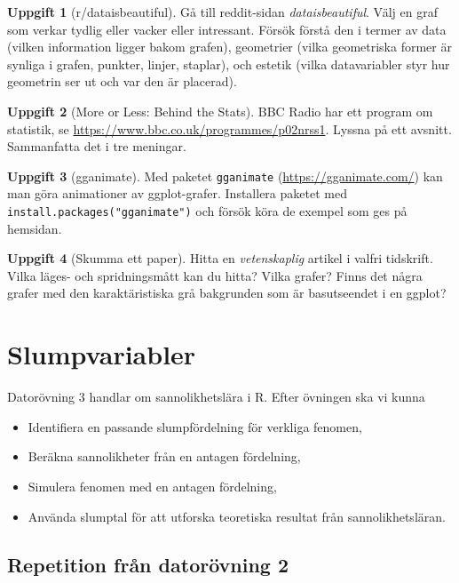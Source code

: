 \documentclass[
]{book}
\theoremstyle{definition}
\theoremstyle{definition}
\theoremstyle{definition}
\newtheorem{exercise}{Uppgift}[chapter]
\theoremstyle{definition}
\theoremstyle{remark}
\begin{document}
\begin{exercise}[r/dataisbeautiful]
Gå till reddit-sidan \emph{dataisbeautiful}. Välj en graf som verkar tydlig eller vacker eller intressant. Försök förstå den i termer av data (vilken information ligger bakom grafen), geometrier (vilka geometriska former är synliga i grafen, punkter, linjer, staplar), och estetik (vilka datavariabler styr hur geometrin ser ut och var den är placerad).
\end{exercise}

\begin{exercise}[More or Less: Behind the Stats]
BBC Radio har ett program om statistik, se \url{https://www.bbc.co.uk/programmes/p02nrss1}. Lyssna på ett avsnitt. Sammanfatta det i tre meningar.
\end{exercise}

\begin{exercise}[gganimate]
Med paketet \texttt{gganimate} (\url{https://gganimate.com/}) kan man göra animationer av ggplot-grafer. Installera paketet med \texttt{install.packages("gganimate")} och försök köra de exempel som ges på hemsidan.
\end{exercise}

\begin{exercise}[Skumma ett paper]
Hitta en \emph{vetenskaplig} artikel i valfri tidskrift. Vilka läges- och spridningsmått kan du hitta? Vilka grafer? Finns det några grafer med den karaktäristiska grå bakgrunden som är basutseendet i en ggplot?
\end{exercise}

\hypertarget{slumpvariabler}{%
\chapter{Slumpvariabler}\label{slumpvariabler}}

Datorövning 3 handlar om sannolikhetslära i R. Efter övningen ska vi kunna

\begin{itemize}
\item
  Identifiera en passande slumpfördelning för verkliga fenomen,
\item
  Beräkna sannolikheter från en antagen fördelning,
\item
  Simulera fenomen med en antagen fördelning,
\item
  Använda slumptal för att utforska teoretiska resultat från sannolikhetsläran.
\end{itemize}

\hypertarget{repetition-fruxe5n-datoruxf6vning-2}{%
\section{Repetition från datorövning 2}\label{repetition-fruxe5n-datoruxf6vning-2}}
\end{document}
